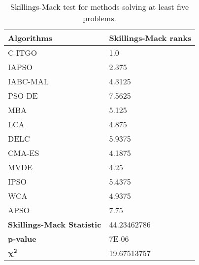 \begin{table}[h]
    \tiny
    \begin{center}
    
    \begin{tabular}{ | P{3.0cm} | P{3.0cm} | }

    \hline

    \rule{0pt}{3ex}
    \textbf{Algorithms} & \textbf{Skillings-Mack ranks}  \\
    \hline

    \rule{0pt}{3ex}
    C-ITGO & 1.0 \\[1em]

    \rule{0pt}{3ex}
    IAPSO & 2.375 \\[1em]

    \rule{0pt}{3ex}
    IABC-MAL & 4.3125 \\[1em]

    \rule{0pt}{3ex}
    PSO-DE & 7.5625 \\[1em]

    \rule{0pt}{3ex}
    MBA & 5.125 \\[1em]

    \rule{0pt}{3ex}
    LCA & 4.875 \\[1em]

    \rule{0pt}{3ex}
    DELC & 5.9375 \\[1em]

    \rule{0pt}{3ex}
    CMA-ES & 4.1875 \\[1em]

    \rule{0pt}{3ex}
    MVDE & 4.25 \\[1em]

    \rule{0pt}{3ex}
    IPSO & 5.4375 \\[1em]

    \rule{0pt}{3ex}
    WCA & 4.9375 \\[1em]

    \rule{0pt}{3ex}
    APSO & 7.75 \\[1em]


    \hline
    
    \rule{0pt}{3ex}    
    \textbf{Skillings-Mack Statistic} & 44.23462786 \\[1em]

    \hline

    \rule{0pt}{3ex}    
    \textbf{p-value} & 7E-06 \\[1em]

    \hline

    \rule{0pt}{3ex}    
    $\bm{\chi^2}$ & 19.67513757 \\[1em]

    \hline

    \end{tabular}
    \end{center}
    \vspace*{-4mm}
    \caption{Skillings-Mack test for methods solving at least five problems. \\[1em]}
    \label{tab:SkillMack_5}
\end{table}